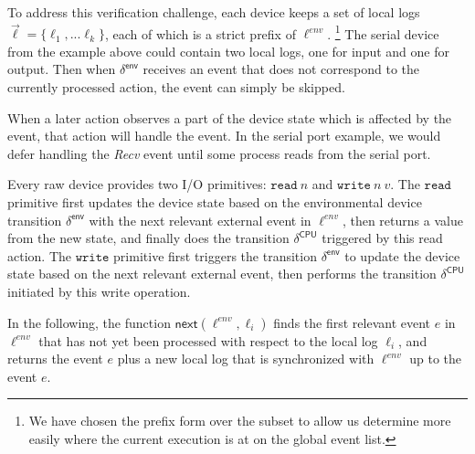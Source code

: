 
To address this verification challenge, each device keeps a set of
local logs $\vec{\ell} = \{\ell_1, ... \ell_k\}$, each of which is a strict prefix
of $\ell^{env}$.  
\footnote{We have chosen the prefix form over the subset to allow us
determine more easily where the current execution is at on the global
event list.}
The serial device from the example above could
contain two local logs, one for input and one for output.  Then when
$\delta^{\textsf{env}}$ receives an event that does not correspond to
the currently processed action, the event can simply be skipped.
When a later action observes a part of the device state which is
affected by the event, that action will handle the event. In the
serial port example, we would defer handling the {\it \textsf{Recv}}
event until some process reads from the serial port.

Every raw device provides two I/O primitives: $\texttt{read} ~ n$ and
$\texttt{write} ~ n ~ v$. The $\texttt{read}$ primitive first updates
the device state based on the environmental device transition
$\delta^{\textsf{env}}$ with the next relevant external event in
$\ell^{env}$, then returns a value from the new state, and finally
does the transition $\delta^{\textsf{CPU}}$ triggered by this read
action. The $\texttt{write}$ primitive first triggers the transition
$\delta^{\textsf{env}}$ to update the device state based on the next
relevant external event, then performs the transition
$\delta^{\textsf{CPU}}$ initiated by this write operation.

In the following, the function $\textsf{next}(\ell^{env}, \ell_i)$ finds
the first relevant event $e$ in $\ell^{env}$ that has not yet been
processed with respect to the local log $\ell_i$, and returns the event
$e$ plus a new local log that is synchronized with $\ell^{env}$ up to
the event $e$.

